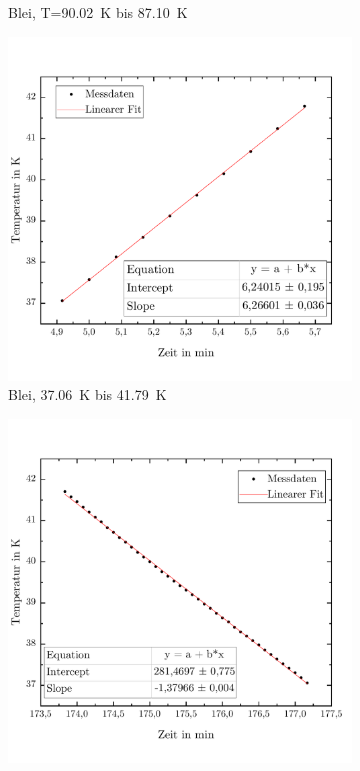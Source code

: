 \documentclass[parskip=half, a4paper,twoside,final]{article}
\begin{document}
\begin{figure}[ht!]
\begin{subfigure}[b!]{0.49\textwidth}
    \vspace{-1cm}
    \caption{Blei, T=\SI{90,02}{\kelvin} bis \SI{87,10}{\kelvin}}
  \end{subfigure}
  \begin{subfigure}[b!]{0.49\textwidth}
    \vspace{-.5cm}
    \includegraphics[width=\textwidth]{Bilder/37_06_41_79_Anstieg.pdf}
    \vspace{-1cm}
    \caption{Blei, \SI{37.06}{\kelvin} bis \SI{41,79}{\kelvin}}
  \end{subfigure}
  \hfill
  \begin{subfigure}[b!]{0.49\textwidth}
    \vspace{-.5cm}
    \includegraphics[width=\textwidth]{Bilder/37,06-41,71.pdf}

\end{subfigure}
\end{figure}
\end{document}
